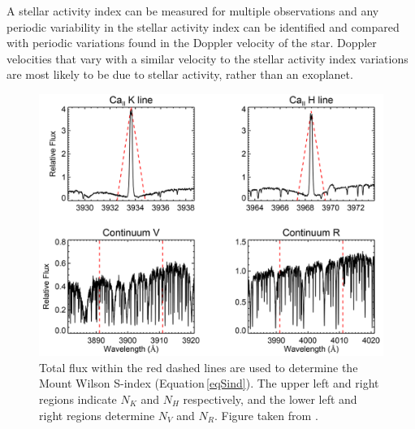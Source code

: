 A stellar activity index can be measured for multiple observations and any periodic variability in the stellar activity index can be identified and compared with periodic variations found in the Doppler velocity of the star. Doppler velocities that vary with a similar velocity to the stellar activity index variations are most likely to be due to stellar activity, rather than an exoplanet.
\begin{figure}
    \hspace{-1cm}
    \includegraphics[scale=0.5]{MtWilson.png}
    \caption{Total flux within the red dashed lines are used to determine the Mount Wilson S-index (Equation\,\ref{eqSind}). The upper left and right regions indicate $N_K$ and $N_H$ respectively, and the lower left and right regions determine $N_V$ and $N_R$. Figure taken from \citet{2015Suarez}.}
    \label{figLPVexample}
\end{figure}
